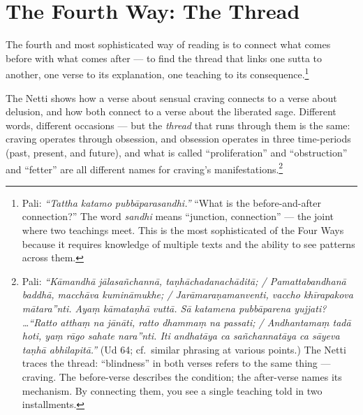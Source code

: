 \section*{The Fourth Way: The Thread}

The fourth and most sophisticated way of reading is to connect what comes before with what comes after --- to find the thread that links one sutta to another, one verse to its explanation, one teaching to its consequence.\footnote{Pali: \textit{``Tattha katamo pubbāparasandhi.''} ``What is the before-and-after connection?'' The word \textit{sandhi} means ``junction, connection'' --- the joint where two teachings meet. This is the most sophisticated of the Four Ways because it requires knowledge of multiple texts and the ability to see patterns across them.}

The Netti shows how a verse about sensual craving connects to a verse about delusion, and how both connect to a verse about the liberated sage. Different words, different occasions --- but the \textit{thread} that runs through them is the same: craving operates through obsession, and obsession operates in three time-periods (past, present, and future), and what is called ``proliferation'' and ``obstruction'' and ``fetter'' are all different names for craving's manifestations.\footnote{Pali: \textit{``Kāmandhā jālasañchannā, taṇhāchadanachāditā; / Pamattabandhanā baddhā, macchāva kumināmukhe; / Jarāmaraṇamanventi, vaccho khīrapakova mātara''nti. Ayaṃ kāmataṇhā vuttā. Sā katamena pubbāparena yujjati? \ldots ``Ratto atthaṃ na jānāti, ratto dhammaṃ na passati; / Andhantamaṃ tadā hoti, yaṃ rāgo sahate nara''nti. Iti andhatāya ca sañchannatāya ca sāyeva taṇhā abhilapitā.''} (Ud 64; cf.\ similar phrasing at various points.) The Netti traces the thread: ``blindness'' in both verses refers to the same thing --- craving. The before-verse describes the condition; the after-verse names its mechanism. By connecting them, you see a single teaching told in two installments.}

